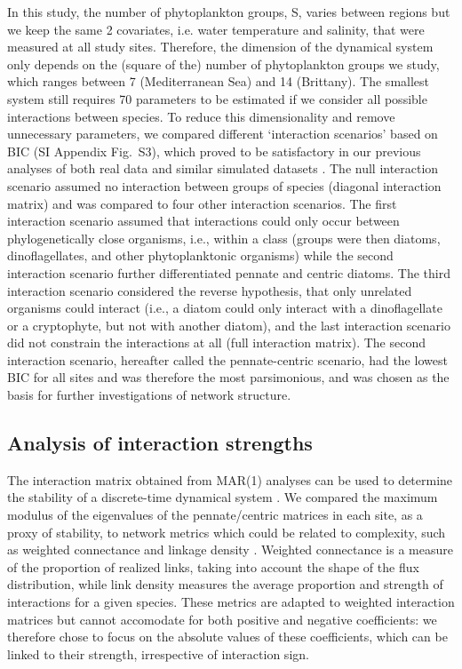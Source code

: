 \documentclass[9pt,twocolumn,twoside,lineno]{pnas-new}
\begin{document}
{In this study, the number of phytoplankton groups, S, varies between
regions but we keep the same 2 covariates, i.e. water temperature
and salinity, that were measured at all study sites. Therefore, the
dimension of the dynamical system only depends on the (square of the)
number of phytoplankton groups we study, which ranges between 7 (Mediterranean
Sea) and 14 (Brittany). The smallest system still requires 70 parameters
to be estimated if we consider all possible interactions between species.
To reduce this dimensionality and remove unnecessary parameters, we
compared different `interaction scenarios' based on BIC (SI Appendix
Fig.~S3), which proved to be satisfactory in our previous analyses
of both real data and similar simulated datasets \cite{barraquand_coastal_2018}.
The null interaction scenario assumed no interaction between groups
of species (diagonal interaction matrix) and was compared to four
other interaction scenarios. The first interaction scenario assumed
that interactions could only occur between phylogenetically close
organisms, i.e., within a class (groups were then diatoms, dinoflagellates,
and other phytoplanktonic organisms) while the second interaction
scenario further differentiated pennate and centric diatoms. The third
interaction scenario considered the reverse hypothesis, that only
unrelated organisms could interact (i.e., a diatom could only interact
with a dinoflagellate or a cryptophyte, but not with another diatom),
and the last interaction scenario did not constrain the interactions
at all (full interaction matrix). The second interaction scenario,
hereafter called the pennate-centric scenario, had the lowest BIC
for all sites and was therefore the most parsimonious, and was chosen
as the basis for further investigations of network structure.

\subsection*{Analysis of interaction strengths}

The interaction matrix obtained from MAR(1) analyses can be used to
determine the stability of a discrete-time dynamical system \cite{ives_estimating_2003}.
We compared the maximum modulus of the eigenvalues of the pennate/centric
matrices in each site, as a proxy of stability, to network metrics
which could be related to complexity, such as weighted connectance
and linkage density \cite{breier_emergence_2018}. Weighted connectance
is a measure of the proportion of realized links, taking into account
the shape of the flux distribution, while link density measures the
average proportion and strength of interactions for a given species.
These metrics are adapted to weighted interaction matrices but cannot
accomodate for both positive and negative coefficients: we therefore
chose to focus on the absolute values of these coefficients, which
can be linked to their strength, irrespective of interaction sign.

}
\end{document}
